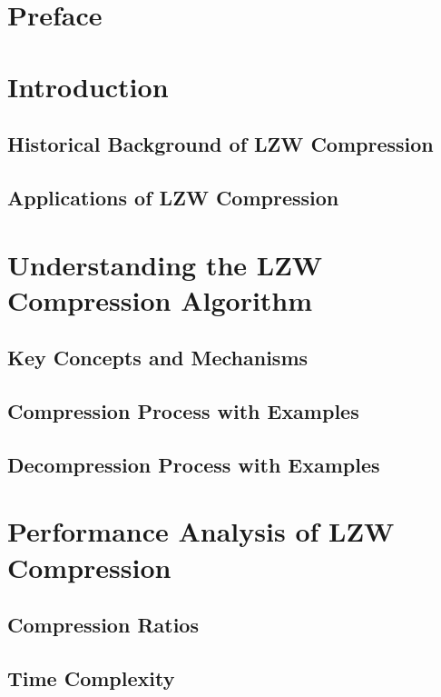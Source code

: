 \documentclass[12pt, a4paper]{article}
\begin{document}
\setcounter{page}{1} 

\newpage

\tableofcontents
\newpage

\section{Preface}

\newpage

\section{Introduction}
\subsection{Historical Background of LZW Compression}

\subsection{Applications of LZW Compression}

\newpage

\section{Understanding the LZW Compression Algorithm}
\subsection{Key Concepts and Mechanisms}

\subsection{Compression Process with Examples}

\subsection{Decompression Process with Examples}

\newpage

\section{Performance Analysis of LZW Compression}
\subsection{Compression Ratios}

\subsection{Time Complexity}

\newpage
\end{document}

